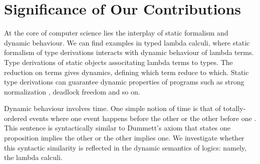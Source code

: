 













\section{Significance of Our Contributions}

At the core of computer science lies the interplay of static formalism
and dynamic behaviour.  We can find examples in typed lambda calculi,
where static formalism of type derivations interacts with dynamic
behaviour of lambda terms.
Type derivations of static objects associtating lambda terms to types.
The reduction on terms gives dynamics, defining which term reduce
to which.  Static type derivations can guarantee dynamic properties of
programs such as strong normalization ,
deadlock freedom 
and so on.

Dynamic behaviour involves time.
One simple notion of time is that of totally-ordered events where
one event happens before the other or the other before one .
This sentence is syntactically similar to Dummett's axiom that states
one proposition implies the other or the other implies one.
We investigate whether this syntactic similarity is reflected
in the dynamic semantics of logics: namely, the lambda calculi.

